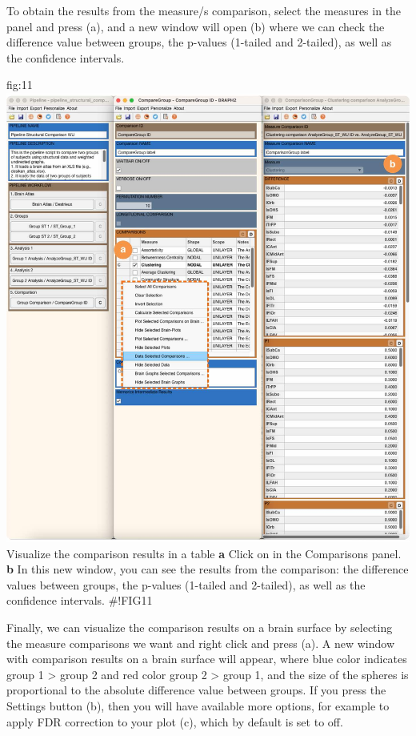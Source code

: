 \documentclass[justified]{tufte-handout}
\begin{document}
To obtain the results from the measure/s comparison, select the measures in the  panel and press ({a}), and a new window will open ({b}) where we can check the difference value between groups, the p-values (1-tailed and 2-tailed), as well as the confidence intervals.

{fig:11}
{\includegraphics{fig11.jpg}
}
{Visualize the comparison results in a table}
{
	{\bf a} Click on  in the Comparisons panel.
	{\bf b} In this new window, you can see the results from the comparison: the difference values between groups, the p-values (1-tailed and 2-tailed), as well as the confidence intervals.
}
#!FIG11

Finally, we can visualize the comparison results on a brain surface by selecting the measure comparisons we want and right click and press  ({a}). A new window with comparison results on a brain surface will appear, where blue color indicates group 1 > group 2 and red color group 2 > group 1, and the size of the spheres is proportional to the absolute difference value between groups. If you press the Settings button ({b}), then you will have available more options, for example to apply FDR correction to your plot ({c}), which by default is set to off.
\end{document}
